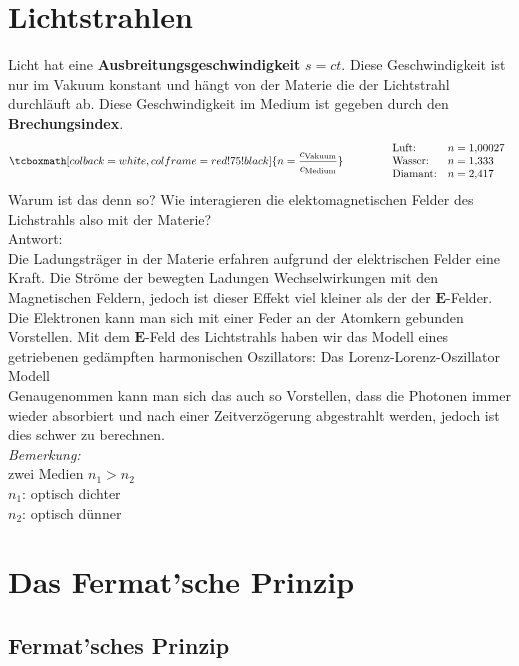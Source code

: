 \documentclass[titlepage,11pt,a4paper,ngerman]{report}
\newcommand{\tx}[1]{\textrm{#1}}
\renewcommand{\vec}[1]{\boldsymbol{#1}}
\newcommand{\lcom}[1]{\color{MidnightBlue}#1\color{black}}
\newcommand{\rmbox}[1]{\tcboxmath[colback=white,colframe=red!75!black]{#1}}
\begin{document}
\section{Lichtstrahlen}
Licht hat eine \textbf{Ausbreitungsgeschwindigkeit} $ s = ct $. Diese Geschwindigkeit ist nur im Vakuum konstant und hängt von der Materie die der Lichtstrahl durchläuft ab. Diese Geschwindigkeit im Medium ist gegeben durch den \textbf{Brechungsindex}.
\begin{equation*}
\rmbox{n = \frac{c_{\tx{Vakuum}}}{c_{\tx{Medium}}}} \qquad \qquad \begin{array}{ll}
\tx{Luft:} & n = 1{,}00027 \\
\tx{Wasser:} & n = 1{,}333 \\
\tx{Diamant:} & n = 2{,}417
\end{array}
\end{equation*}
\lcom{Warum ist das denn so? Wie interagieren die elektomagnetischen Felder des Lichstrahls also mit der Materie?}\\
Antwort:\\
\lcom{Die Ladungsträger in der Materie erfahren aufgrund der elektrischen Felder eine Kraft. Die Ströme der bewegten Ladungen Wechselwirkungen mit den Magnetischen Feldern, jedoch ist dieser Effekt viel kleiner als der der $ \vec{E} $-Felder.\\
Die Elektronen kann man sich mit einer Feder an der Atomkern gebunden Vorstellen. Mit dem $ \vec{E} $-Feld des Lichtstrahls haben wir das Modell eines getriebenen gedämpften harmonischen Oszillators: Das Lorenz-Lorenz-Oszillator Modell}\\
Genaugenommen kann man sich das auch so Vorstellen, dass die Photonen immer wieder absorbiert und nach einer Zeitverzögerung abgestrahlt werden, jedoch ist dies schwer zu berechnen.\\[10pt]
\emph{Bemerkung:}\\
zwei Medien $ n_1 > n_2 $\\
$ n_1 $: optisch dichter\\
$ n_2 $: optisch dünner

\section{Das Fermat'sche Prinzip}

\subsection{Fermat'sches Prinzip}
\end{document}
